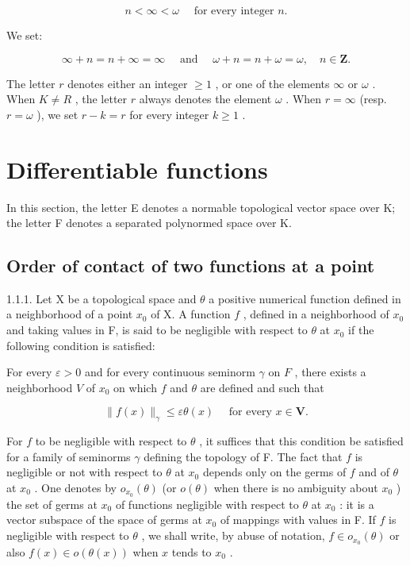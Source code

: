 \[
n <   \infty <   \omega \quad \text { for   every   integer } n.
\]

We set:

\[
\infty + n = n + \infty = \infty \quad \text { and } \quad \omega + n = n + \omega = \omega , \quad n \in \mathbf {Z}.
\]

The letter \(r\) denotes either an integer \(\geqslant 1\) , or one of the elements \(\infty\) or \(\omega\) . When \(K \neq R\) , the letter \(r\) always denotes the element \(\omega\) . When \(r = \infty\) (resp. \(r = \omega\) ), we set \(r - k = r\) for every integer \(k \geqslant 1\) .

\section{Differentiable functions}

In this section, the letter E denotes a normable topological vector space over K; the letter F denotes a separated polynormed space over K.

\subsection{Order of contact of two functions at a point}

1.1.1. Let X be a topological space and \(\theta\) a positive numerical function defined in a neighborhood of a point \(x_0\) of X. A function \(f\) , defined in a neighborhood of \(x_0\) and taking values in F, is said to be negligible with respect to \(\theta\) at \(x_0\) if the following condition is satisfied:

For every \(\varepsilon > 0\) and for every continuous seminorm \(\gamma\) on \(F\) , there exists a neighborhood \(V\) of \(x_0\) on which \(f\) and \(\theta\) are defined and such that

\[
\| f (x) \| _ {\gamma} \leqslant \varepsilon \theta (x) \quad \text { for   every } x \in \mathbf {V}.
\]

For \(f\) to be negligible with respect to \(\theta\) , it suffices that this condition be satisfied for a family of seminorms \(\gamma\) defining the topology of F. The fact that \(f\) is negligible or not with respect to \(\theta\) at \(x_{0}\) depends only on the germs of \(f\) and of \(\theta\) at \(x_{0}\) . One denotes by \(o_{x_{0}}(\theta)\) (or \(o(\theta)\) when there is no ambiguity about \(x_{0}\) ) the set of germs at \(x_{0}\) of functions negligible with respect to \(\theta\) at \(x_{0}\) : it is a vector subspace of the space of germs at \(x_{0}\) of mappings with values in F. If \(f\) is negligible with respect to \(\theta\) , we shall write, by abuse of notation, \(f \in o_{x_{0}}(\theta)\) or also \(f(x) \in o(\theta(x))\) when \(x\) tends to \(x_{0}\) .

